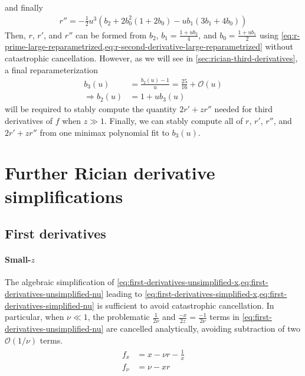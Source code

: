 \documentclass{article}
\begin{document}
%
and finally
%
\begin{align}\label{eq:r-second-derivative-large-reparametrized}
  \boxed{r'' = -\frac{1}{2} u^3 (b_2 + 2 b_0^2 (1 + 2 b_0) - u b_1 (3 b_1 + 4 b_0))}
\end{align}
%
Then, $r$, $r'$, and $r''$ can be formed from $b_2$, $b_1 = \frac{1 + u b_2}{4}$, and $b_0 = \frac{1 + u b_1}{2}$ using \cref{eq:r-prime-large-reparametrized,eq:r-second-derivative-large-reparametrized} without catastrophic cancellation.
However, as we will see in \cref{sec:rician-third-derivatives}, a final reparameterization
%
\begin{align}
  b_3(u)             & = \frac{b_2(u)-1}{u} = \frac{25}{16} + \mathcal{O}(u) \\
  \Rightarrow b_2(u) & = 1 + u b_3(u)
\end{align}
%
will be required to stably compute the quantity $2r'+zr''$ needed for third derivatives of $f$ when $z \gg 1$.
Finally, we can stably compute all of $r$, $r'$, $r''$, and $2r'+zr''$ from one minimax polynomial fit to $b_3(u)$.

%

\section{Further Rician derivative simplifications}

\subsection{First derivatives}\label{sec:rician-first-derivatives}

\paragraph{Small-$z$}

The algebraic simplification of \cref{eq:first-derivatives-unsimplified-x,eq:first-derivatives-unsimplified-nu} leading to \cref{eq:first-derivatives-simplified-x,eq:first-derivatives-simplified-nu} is sufficient to avoid catastrophic cancellation.
In particular, when $\nu \ll 1$, the problematic $\frac{1}{2\nu}$ and $\frac{-x}{2z} = \frac{-1}{2\nu}$ terms in \cref{eq:first-derivatives-unsimplified-nu} are cancelled analytically, avoiding subtraction of two $\mathcal{O}(1/\nu)$ terms.
%
\begin{align}\label{eq:first-derivatives-small-z}
  \boxed{
    \begin{aligned}
      f_x   & = x - \nu r - \frac{1}{x} \\
      f_\nu & = \nu - x r
    \end{aligned}
  }
\end{align}
\end{document}
